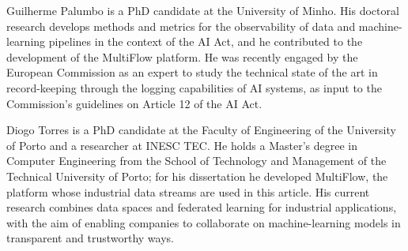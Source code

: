 \documentclass[a4paper,fleqn]{cas-dc}
\begin{document}
\bio{}
Guilherme Palumbo is a PhD candidate at the University of Minho. His doctoral research develops methods and metrics for the observability of data and machine-learning pipelines in the context of the AI Act, and he contributed to the development of the MultiFlow platform. He was recently engaged by the European Commission as an expert to study the technical state of the art in record-keeping through the logging capabilities of AI systems, as input to the Commission’s guidelines on Article 12 of the AI Act.
\endbio

\bio{}
Diogo Torres is a PhD candidate at the Faculty of Engineering of the University of Porto and a researcher at INESC TEC. He holds a Master’s degree in Computer Engineering from the School of Technology and Management of the Technical University of Porto; for his dissertation he developed MultiFlow, the platform whose industrial data streams are used in this article. His current research combines data spaces and federated learning for industrial applications, with the aim of enabling companies to collaborate on machine-learning models in transparent and trustworthy ways.
\endbio
\end{document}

